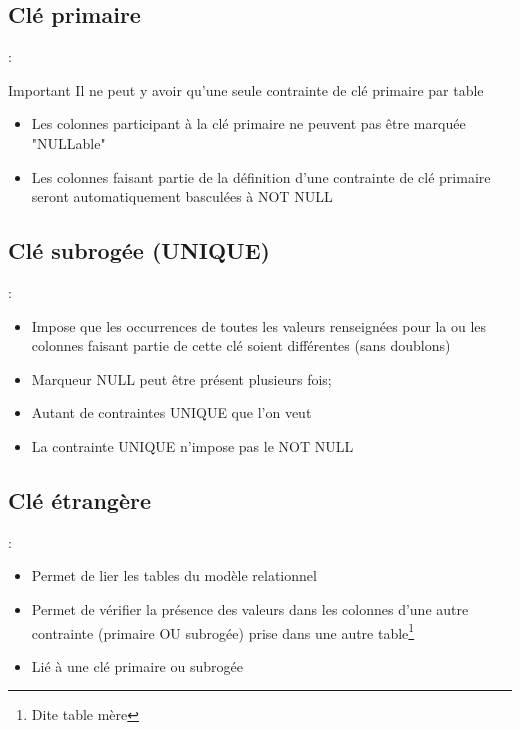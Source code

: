 \documentclass[10pt]{beamer}
\begin{document}
\subsection{Clé primaire}
\begin{frame}{\secname : \subsecname}
    \begin{alertblock}{Important}
        Il ne peut y avoir qu'une seule contrainte de clé primaire par table
    \end{alertblock}
    \begin{itemize}
        \item Les colonnes participant à la clé primaire ne peuvent pas être marquée "NULLable"
        \item Les colonnes faisant partie de la définition d'une contrainte de clé primaire seront automatiquement basculées à NOT NULL
    \end{itemize}
\end{frame}

\subsection{Clé subrogée (UNIQUE)}
\begin{frame}{\secname : \subsecname}
    \begin{itemize}
        \item Impose que les occurrences de toutes les valeurs renseignées pour la ou les colonnes faisant partie de cette clé soient différentes (sans doublons)
        \item Marqueur NULL peut être présent plusieurs fois;
        \item Autant de contraintes UNIQUE que l'on veut
        \item La contrainte UNIQUE n'impose pas le NOT NULL
    \end{itemize}
\end{frame}

\subsection{Clé étrangère}
\begin{frame}{\secname : \subsecname}
    \begin{itemize}
        \item Permet de lier les tables du modèle relationnel
        \item Permet de vérifier la présence des valeurs dans les colonnes d'une autre contrainte (primaire OU subrogée) prise dans une autre table\footnote{Dite table mère}
        \item Lié à une clé primaire ou subrogée
    \end{itemize}
\end{frame}
\end{document}
